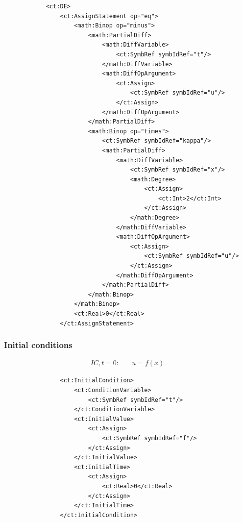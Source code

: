 \lstset{language=XML}
\begin{lstlisting}
            <ct:DE>
                <ct:AssignStatement op="eq">
                    <math:Binop op="minus">
                        <math:PartialDiff>
                            <math:DiffVariable>
                                <ct:SymbRef symbIdRef="t"/>
                            </math:DiffVariable>
                            <math:DiffOpArgument>
                                <ct:Assign>
                                    <ct:SymbRef symbIdRef="u"/>
                                </ct:Assign>
                            </math:DiffOpArgument>
                        </math:PartialDiff>
                        <math:Binop op="times">
                            <ct:SymbRef symbIdRef="kappa"/>
                            <math:PartialDiff>
                                <math:DiffVariable>
                                    <ct:SymbRef symbIdRef="x"/>
                                    <math:Degree>
                                        <ct:Assign>
                                            <ct:Int>2</ct:Int>
                                        </ct:Assign>
                                    </math:Degree>
                                </math:DiffVariable>
                                <math:DiffOpArgument>
                                    <ct:Assign>
                                        <ct:SymbRef symbIdRef="u"/>
                                    </ct:Assign>
                                </math:DiffOpArgument>
                            </math:PartialDiff>
                        </math:Binop>
                    </math:Binop>
                    <ct:Real>0</ct:Real>
                </ct:AssignStatement>
\end{lstlisting}

\subsubsection*{Initial conditions}

\begin{align}
IC, t=0: \quad & u = f(x)\nonumber 
\end{align}

\lstset{language=XML}
\begin{lstlisting}
                <ct:InitialCondition>
                    <ct:ConditionVariable>
                        <ct:SymbRef symbIdRef="t"/>
                    </ct:ConditionVariable>
                    <ct:InitialValue>
                        <ct:Assign>
                            <ct:SymbRef symbIdRef="f"/>
                        </ct:Assign>
                    </ct:InitialValue>
                    <ct:InitialTime>
                        <ct:Assign>
                            <ct:Real>0</ct:Real>
                        </ct:Assign>
                    </ct:InitialTime>
                </ct:InitialCondition>
\end{lstlisting}

